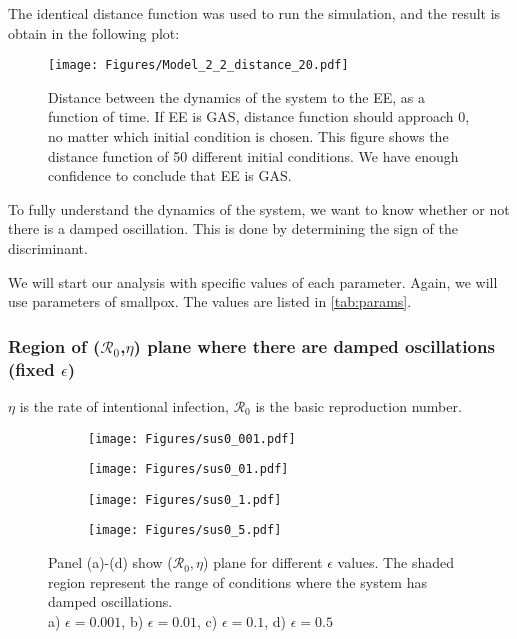 \documentclass[12pt]{article}
\newcommand{\R}{\mathcal{R}}
\begin{document}
The identical distance function was used to run the simulation, and the result is obtain in the following plot:

\begin{figure}[H]
  \centering
  \texttt{[image: Figures/Model\_2\_2\_distance\_20.pdf]}
  \caption{Distance between the dynamics of the system to the EE, as a function of time. If EE is GAS, distance function should approach 0, no matter which initial condition is chosen. This figure shows the distance function of 50 different initial conditions. We have enough confidence to conclude that EE is GAS.}
\end{figure}

To fully understand the dynamics of the system, we want to know whether or not there is a damped oscillation. This is done by determining the sign of the discriminant.

We will start our analysis with specific values of each parameter. Again, we will use parameters of smallpox. The values are listed in \autoref{tab:params}.
\subsubsection{Region of ($\R_0$,$\eta$) plane where there are damped oscillations (fixed $\epsilon$)}

$\eta$ is the rate of intentional infection, $\R_0$ is the basic reproduction number.

\begin{figure}[h]
\centering

\begin{subfigure}[t]{.4\textwidth}
\centering
\texttt{[image: Figures/sus0\_001.pdf]}
        \caption{}\label{fig:fig_aa}
\end{subfigure}
%
\begin{subfigure}[t]{.4\textwidth}
\centering
\texttt{[image: Figures/sus0\_01.pdf]}
\caption{}\label{fig:fig_bb}
\end{subfigure}

\medskip

\begin{subfigure}[t]{.4\textwidth}
\centering
\vspace{0pt}%
\texttt{[image: Figures/sus0\_1.pdf]}
\caption{}\label{fig:fig_cc}
\end{subfigure}
%
\begin{subfigure}[t]{.4\textwidth}
\centering
\vspace{0pt}%
\texttt{[image: Figures/sus0\_5.pdf]}
\caption{}\label{fig:fig_dd}
\end{subfigure}
%
\begin{minipage}[t]{0.9\textwidth}
\caption{Panel (a)-(d) show ($\R_0,\eta$) plane for different $\epsilon$ values. The shaded region represent the range of conditions where the system has damped oscillations.\\
a) $\epsilon=0.001$, b) $\epsilon=0.01$, c) $\epsilon=0.1$, d) $\epsilon=0.5$}
\end{minipage}
\end{figure}
\end{document}
